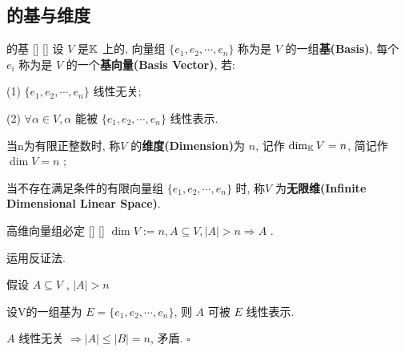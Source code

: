 \documentclass[UTF8]{ctexart}
\DeclareMathOperator{\0}{\mathbf{0}}
\DeclareMathOperator{\<}{\langle}
\renewcommand{\>}{\rangle}
\begin{document}
	\subsection{ 的基与维度}
		
		\begin{dfn}
			[]
			{ 的基}
			[]
			[]
			设 \(V\) 是 \(\operatorname{\mathbb{K}}\) 上的, 向量组 \(\{e_{1},e_{2},\cdots,e_{n}\}\) 称为是 \(V\) 的一组\textbf{基(Basis)}, 每个 \(e_{i}\) 称为是 \(V\) 的一个\textbf{基向量(Basis Vector)}, 若:
			 
			(1) \(\{e_{1},e_{2},\cdots,e_{n}\}\) 线性无关; 
			
			(2) \(\forall \alpha\in V,\alpha\) 能被 \(\{e_{1},e_{2},\cdots,e_{n}\}\) 线性表示. 
			
			当n为有限正整数时, 称 \(V\) 的\textbf{维度(Dimension)}为 \(n\), 记作 \(\dim_{\operatorname{\mathbb{K}}}V=n\), 简记作 \(\dim V=n\) ; 
			
			当不存在满足条件的有限向量组 \(\{e_{1},e_{2},\cdots,e_{n}\}\) 时, 称 \(V\) 为\textbf{无限维(Infinite Dimensional Linear Space)}. 

		\end{dfn}
		
		\begin{ppt}
			[]
			{高维向量组必定}
			[]
			[]
			 \(\dim V:=n, A\subseteq V, |A|>n\Longrightarrow A\) . 
		\end{ppt}
  
		\begin{prf}
			
			运用反证法. 
			
			假设 \(A\subseteq V\) , \(|A|>n\)  
			
			设V的一组基为 \(E=\{e_{1},e_{2},\cdots,e_{n}\}\), 则 \(A\) 可被 \(E\) 线性表示. 
			
			 \(A\) 线性无关 \(\Longrightarrow |A|\leq |B|=n\), 矛盾.  \(\square\) 
		\end{prf}
  
\end{document}
